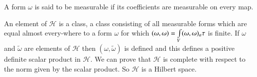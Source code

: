 A form $\omega$ is said to be measurable if its coefficients are
measurable on every map.

An element of $\mathscr{H}$ is a class, a class consisting of all
measurable forms which are equal almost every-where to a form $\omega$
for which $(\omega,\omega)\break =\int\limits_{V}(\omega,\omega)_{a}\tau$ is
finite. If $\omega$ and $\widetilde{\omega}$ are elements of
$\mathscr{H}$ then $(\omega,\widetilde{\omega})$ is defined and this
defines a positive definite scalar product in $\mathscr{H}$. We can
prove that $\mathscr{H}$ is complete with respect to the norm given by
the scalar product. So $\mathscr{H}$ is a Hilbert space.

